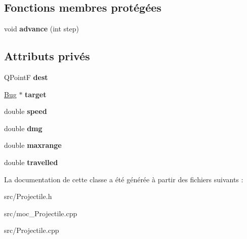 \subsection*{Fonctions membres protégées}
\begin{DoxyCompactItemize}
\item 
\hypertarget{classProjectile_a8e3b4bae49558a0febfce8c1accea72d}{
void {\bfseries advance} (int step)}
\label{classProjectile_a8e3b4bae49558a0febfce8c1accea72d}

\end{DoxyCompactItemize}
\subsection*{Attributs privés}
\begin{DoxyCompactItemize}
\item 
\hypertarget{classProjectile_a15091a3a02fbfac2dd4fb44ac9cbceab}{
QPointF {\bfseries dest}}
\label{classProjectile_a15091a3a02fbfac2dd4fb44ac9cbceab}

\item 
\hypertarget{classProjectile_ae5273bd2c6550b94f38310b69859b093}{
\hyperlink{classBug}{Bug} $\ast$ {\bfseries target}}
\label{classProjectile_ae5273bd2c6550b94f38310b69859b093}

\item 
\hypertarget{classProjectile_aae1f5d683c71d152b6a12d922ec4714f}{
double {\bfseries speed}}
\label{classProjectile_aae1f5d683c71d152b6a12d922ec4714f}

\item 
\hypertarget{classProjectile_ac94938ed5b3d3e01217bf72f80ad2e3d}{
double {\bfseries dmg}}
\label{classProjectile_ac94938ed5b3d3e01217bf72f80ad2e3d}

\item 
\hypertarget{classProjectile_a019db4c89ccf3eb291b06ba7b55f0754}{
double {\bfseries maxrange}}
\label{classProjectile_a019db4c89ccf3eb291b06ba7b55f0754}

\item 
\hypertarget{classProjectile_a0fc0c0258f36a9347f45d1edb8b767e5}{
double {\bfseries travelled}}
\label{classProjectile_a0fc0c0258f36a9347f45d1edb8b767e5}

\end{DoxyCompactItemize}


La documentation de cette classe a été générée à partir des fichiers suivants :\begin{DoxyCompactItemize}
\item 
src/Projectile.h\item 
src/moc\_\-Projectile.cpp\item 
src/Projectile.cpp\end{DoxyCompactItemize}
